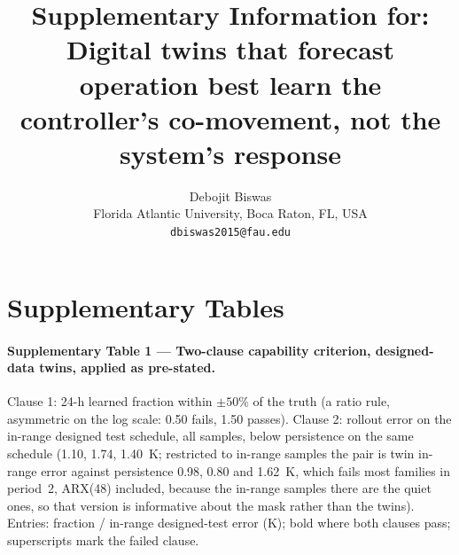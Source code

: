 \documentclass[11pt]{article}
\title{Supplementary Information for: Digital twins that forecast operation best learn the controller's co-movement, not the system's response}
\author{Debojit Biswas\\[2pt]\small Florida Atlantic University, Boca Raton, FL, USA\\\small \texttt{dbiswas2015@fau.edu}}
\date{}
\begin{document}
\maketitle
\section*{Supplementary Tables}
\paragraph{Supplementary Table 1 --- Two-clause capability criterion, designed-data twins, applied as pre-stated.} Clause 1: 24-h learned fraction within $\pm50\%$ of the truth (a ratio rule, asymmetric on the log scale: 0.50 fails, 1.50 passes). Clause 2: rollout error on the in-range designed test schedule, all samples, below persistence on the same schedule (1.10, 1.74, 1.40~K; restricted to in-range samples the pair is twin in-range error against persistence 0.98, 0.80 and 1.62~K, which fails most families in period~2, ARX(48) included, because the in-range samples there are the quiet ones, so that version is informative about the mask rather than the twins). Entries: fraction / in-range designed-test error (K); bold where both clauses pass; superscripts mark the failed clause.
\end{document}
